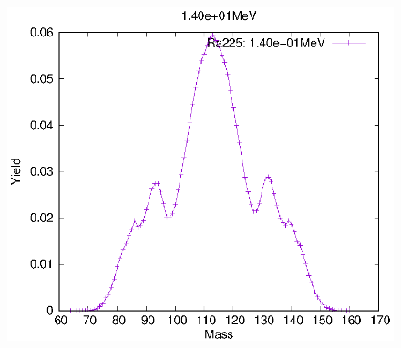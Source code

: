 \begin{figure}[htbp]
\begin{minipage}{0.33\textwidth} \begin{center} \includegraphics[width=\textwidth]{YA/Ra225_1.40e+01.eps} \end{center} \end{minipage}
\end{figure}
\clearpage

